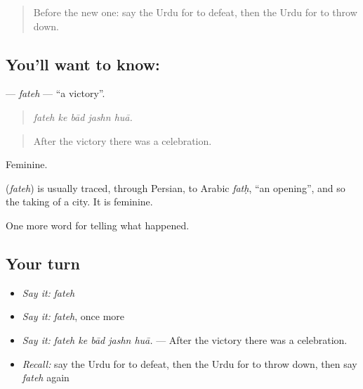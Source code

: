 \label{lesson:UR-C311-fateh}



\begin{quote}
Before the new one: say the Urdu for to defeat, then the Urdu for to throw down.
\end{quote}

\subsection*{You'll want to know: }
\textbf{} — \emph{fateh} — \textquotedblleft{}a victory\textquotedblright{}.

\begin{quote}
    
\end{quote}

\begin{quote}
\emph{fateh ke bād jashn huā.}
\end{quote}

\begin{quote}
After the victory there was a celebration.
\end{quote}

Feminine.

\begin{cousinweb}
\textbf{} (\emph{fateh}) is usually traced, through Persian, to Arabic \emph{fatḥ}, \textquotedblleft{}an opening\textquotedblright{}, and so the taking of a city. It is feminine.
\end{cousinweb}

\begin{grammarlens}[title={What you've built}]
One more word for telling what happened.
\end{grammarlens}

\subsection*{Your turn}
\begin{itemize}
\raggedright
  \item \emph{Say it:} \emph{fateh}
  \item \emph{Say it:} \emph{fateh}, once more
  \item \emph{Say it:} \emph{fateh ke bād jashn huā.} — After the victory there was a celebration.
  \item \emph{Recall:} say the Urdu for to defeat, then the Urdu for to throw down, then say \emph{fateh} again
\end{itemize}

